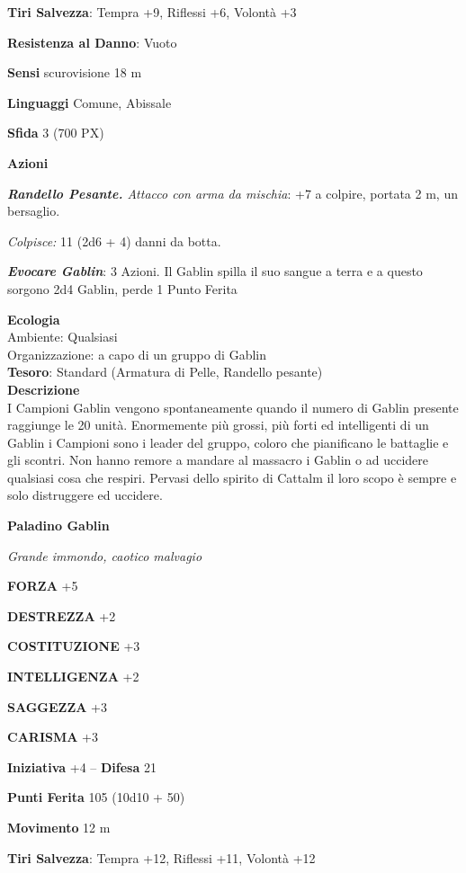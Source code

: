 \begin{multicols}{2}
\textbf{Tiri Salvezza}: Tempra +9, Riflessi +6, Volontà +3

\textbf{Resistenza al Danno}: Vuoto

\textbf{Sensi} scurovisione 18 m

\textbf{Linguaggi} Comune, Abissale

\textbf{Sfida} 3 (700 PX)

\textbf{Azioni}

\textit{\textbf{Randello Pesante.} Attacco con arma da mischia}: +7 a colpire, portata 2 m, un bersaglio.

\textit{Colpisce:} 11 (2d6 + 4) danni da botta.

\textit{\textbf{Evocare Gablin}}: 3 Azioni. Il Gablin spilla il suo sangue a terra e a questo sorgono 2d4 Gablin, perde 1 Punto Ferita

\textbf{Ecologia}\\
Ambiente: Qualsiasi\\
Organizzazione: a capo di un gruppo di Gablin\\
\textbf{Tesoro}: Standard (Armatura di Pelle, Randello pesante)\\
\textbf{Descrizione}\\
I Campioni Gablin vengono spontaneamente quando il numero di Gablin presente raggiunge le 20 unità. Enormemente più grossi, più forti ed intelligenti di un Gablin i Campioni sono i leader del gruppo, coloro che pianificano le battaglie e gli scontri.
Non hanno remore a mandare al massacro i Gablin o ad uccidere qualsiasi cosa che respiri. Pervasi dello spirito di Cattalm il loro scopo è sempre e solo distruggere ed uccidere.


\medskip{}\textbf{Paladino Gablin}

\textit{Grande immondo, caotico malvagio}

\textbf{FORZA} +5

\textbf{DESTREZZA} +2

\textbf{COSTITUZIONE} +3

\textbf{INTELLIGENZA} +2

\textbf{SAGGEZZA} +3

\textbf{CARISMA} +3

\textbf{Iniziativa} +4 -- \textbf{Difesa} 21

\textbf{Punti Ferita} 105 (10d10 + 50)

\textbf{Movimento} 12 m

\textbf{Tiri Salvezza}: Tempra +12, Riflessi +11, Volontà +12


\end{multicols}
